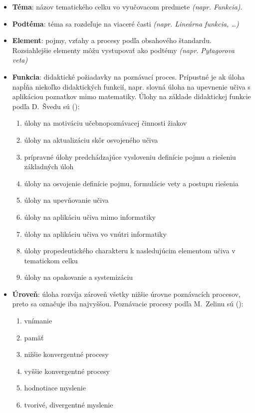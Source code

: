 \begin{itemize}[noitemsep]
\item \textbf{Téma}: názov tematického celku vo vyučovacom predmete \emph{(napr. Funkcia)}.
\item \textbf{Podtéma}: téma sa rozdeľuje na viaceré časti \emph{(napr. Lineárna funkcia, \dots)}
\item \textbf{Element}: pojmy, vzťahy a procesy podľa obsahového štandardu. Rozsiahlejšie elementy môžu vystupovať ako podtémy \emph{(napr. Pytagorova veta)}
\item \textbf{Funkcia}: didaktické požiadavky na poznávací proces. Prípustné je ak úloha napĺňa niekoľko didaktických funkcií, napr. slovná úloha na upevnenie učiva s aplikáciou poznatkov mimo matematiky. Úlohy na základe didaktickej funkcie podľa D.~Švedu sú (\cite{sveda_ulohy_1992}):
\begin{enumerate}[label=\alph*),noitemsep,topsep=0pt]
\item úlohy na motiváciu učebnopoznávacej činnosti žiakov
\item úlohy na aktualizáciu skôr osvojeného učiva
\item prípravné úlohy predchádzajúce vysloveniu definície pojmu a riešeniu základných úloh 
\item úlohy na osvojenie definície pojmu, formulácie vety a postupu riešenia
\item úlohy na upevňovanie učiva
\item úlohy na aplikáciu učiva mimo informatiky
\item úlohy na aplikáciu učiva vo vnútri informatiky
\item úlohy propedeutického charakteru k nasledujúcim elementom učiva v tematickom celku
\item úlohy na opakovanie a systemizáciu
\end{enumerate}

\item \textbf{Úroveň}: úloha rozvíja zároveň všetky nižšie úrovne poznávacích procesov, preto sa označuje iba najvyššou. Poznávacie procesy podľa M.~Zelinu sú (\cite{zelina_tvorivost_1990}):
\begin{enumerate}[label=\alph*),noitemsep,topsep=0pt]
\item vnímanie
\item pamäť
\item nižšie konvergentné procesy
\item vyššie konvergentné procesy
\item hodnotiace myslenie
\item tvorivé, divergentné myslenie
\end{enumerate}
\end{itemize}

